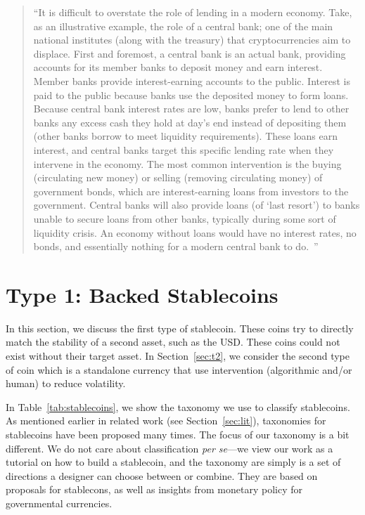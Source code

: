 \begin{quote}

``It is difficult to overstate the role of lending in a modern economy. Take, as an illustrative example, the role of a central bank; one of the main national institutes (along with the treasury) that cryptocurrencies aim to displace. First and foremost, a central bank is an actual bank, providing accounts for its member banks to deposit money and earn interest. Member banks provide interest-earning accounts to the public. Interest is paid to the public because banks use the deposited money to form loans. Because central bank interest rates are low, banks prefer to lend to other banks any excess cash they hold at day's end instead of depositing them (other banks borrow to meet liquidity requirements). These loans earn interest, and central banks target this specific lending rate when they intervene in the economy. The most common intervention is the buying (circulating new money) or selling (removing circulating money) of government bonds, which are interest-earning loans from investors to the government. Central banks will also provide loans (of `last resort') to banks unable to secure loans from other banks, typically during some sort of liquidity crisis. An economy without loans would have no interest rates, no bonds, and essentially nothing for a modern central bank to do.~\cite{okoyetoward}''

\end{quote}




\section{Type 1: Backed Stablecoins}
\label{sec:t1}

In this section, we discuss the first type of stablecoin. These coins try to directly match the stability of a second asset, such as the USD. These coins could not exist without their target asset. In Section~\ref{sec:t2}, we consider the second type of coin which is a standalone currency that use intervention (algorithmic and/or human) to reduce volatility.



In Table~\ref{tab:stablecoins}, we show the taxonomy we use to classify stablecoins. As mentioned earlier in related work (see Section~\ref{sec:lit}), taxonomies for stablecoins have been proposed many times. The focus of our taxonomy is a bit different. We do not care about classification \textit{per se}---we view our work as a tutorial on how to build a stablecoin, and the taxonomy are simply is a set of directions a designer can choose between or combine. They are based on proposals for stablecons, as well as insights from monetary policy for governmental currencies. 

